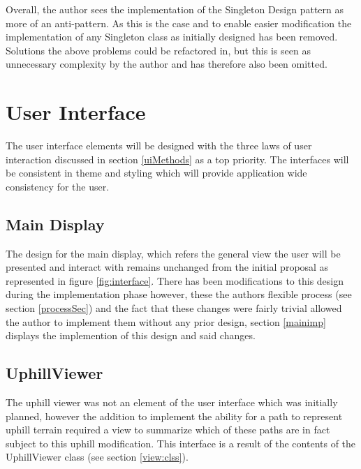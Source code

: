 Overall, the author sees the implementation of the Singleton Design pattern as more of an anti-pattern. As this is the case and to enable easier modification the implementation of any Singleton class as initially designed has been removed. Solutions the above problems could be refactored in, but this is seen as unnecessary complexity by the author and has therefore also been omitted.

\section{User Interface}
\label{interfacebrah}
The user interface elements will be designed with the three laws of user interaction discussed in section \ref{uiMethods} as a top priority. The interfaces will be consistent in theme and styling which will provide application wide consistency for the user.

\subsection{Main Display}

The design for the main display, which refers the general view the user will be presented and interact with remains unchanged from the initial proposal as represented in figure \ref{fig:interface}. There has been modifications to this design during the implementation phase however, these the authors flexible process (see section \ref{processSec}) and the fact that these changes were fairly trivial allowed the author to implement them without any prior design, section \ref{mainimp} displays the implemention of this design and said changes.

\subsection{UphillViewer}
\label{uphillview}

The uphill viewer was not an element of the user interface which was initially planned, however the addition to implement the ability for a path to represent uphill terrain required a view to summarize which of these paths are in fact subject to this uphill modification. This interface is a result of the contents of the UphillViewer class (see section \ref{view:clss}).

